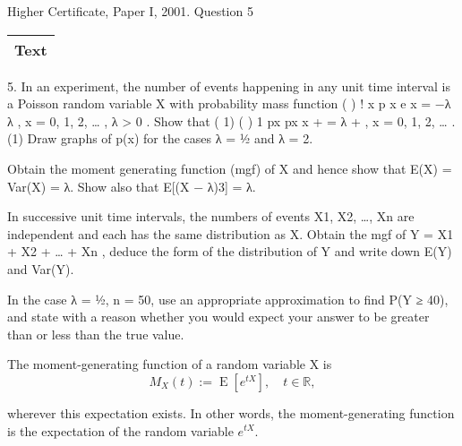 \documentclass[a4paper,12pt]{article}
\begin{document}
Higher Certificate, Paper I, 2001. Question 5
\begin{table}[ht!]
 \centering
 \begin{tabular}{|p{15cm}|}
 \hline
\noindent Text
\\ \hline
  \end{tabular}
\end{table}

\begin{framed}


5. In an experiment, the number of events happening in any unit time interval is a
Poisson random variable X with probability mass function
( ) !
x
p x e
x
= −λ λ , x = 0, 1, 2, … , λ > 0 .
Show that
( 1) ( )
1
px px
x
+ = λ
+
, x = 0, 1, 2, … .
(1)
Draw graphs of p(x) for the cases λ = ½ and λ = 2.

Obtain the moment generating function (mgf) of X and hence show that
E(X) = Var(X) = λ. Show also that E[(X − λ)3] = λ.

In successive unit time intervals, the numbers of events X1, X2, …, Xn are
independent and each has the same distribution as X. Obtain the mgf of
Y = X1 + X2 + … + Xn , deduce the form of the distribution of Y and write down
E(Y) and Var(Y).

In the case λ = ½, n = 50, use an appropriate approximation to find P(Y ≥ 40), and
state with a reason whether you would expect your answer to be greater than or
less than the true value.


\end{framed}


\begin{framed}
\noindent The moment-generating function of a random variable X is 
\[{\displaystyle M_{X}(t):=\operatorname{E} \left[e^{tX}\right],\quad t\in \mathbb{R} ,} \]

\noindent wherever this expectation exists. In other words, the moment-generating function is the expectation of the random variable 
${\displaystyle e^{tX}}. $
  \end{framed}
\end{document}
